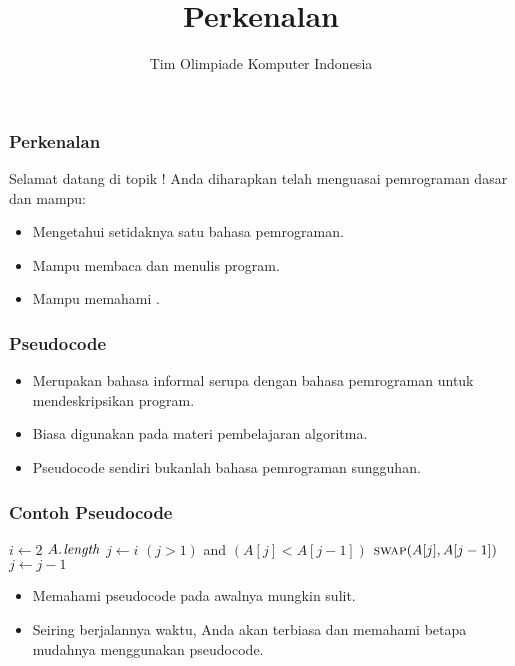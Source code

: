 

\title{Perkenalan}
\author{Tim Olimpiade Komputer Indonesia}
\date{}



\begin{frame}
\titlepage
\end{frame}

\begin{frame}
\frametitle{Perkenalan}
Selamat datang di topik !
\newline
\newline
Anda diharapkan telah menguasai pemrograman dasar dan mampu:
\begin{itemize}
  \item Mengetahui setidaknya satu bahasa pemrograman.
  \item Mampu membaca dan menulis program.
  \item Mampu memahami .
\end{itemize}
\end{frame}

\begin{frame}
\frametitle{Pseudocode}
\begin{itemize}
  \item Merupakan bahasa informal serupa dengan bahasa pemrograman untuk mendeskripsikan program.
  \item Biasa digunakan pada materi pembelajaran algoritma.
  \item Pseudocode sendiri bukanlah bahasa pemrograman sungguhan.
\end{itemize}
\end{frame}


\begin{frame}
\frametitle{Contoh Pseudocode}
\begin{codebox}
\li \For $i \gets 2$ \To $\attrib{A}{length}$
    \Do
\li   $j \gets i$
\li   \While $(j > 1)$ and $(A[j] < A[j-1])$
      \Do
\li     $\textnormal{\scshape swap}(A[j], A[j-1])$
\li     $j \gets j-1$
      \End
    \End
\end{codebox}

\begin{itemize}
  \item Memahami pseudocode pada awalnya mungkin sulit.
  \item Seiring berjalannya waktu, Anda akan terbiasa dan memahami betapa mudahnya menggunakan pseudocode.
\end{itemize}
\end{frame}

